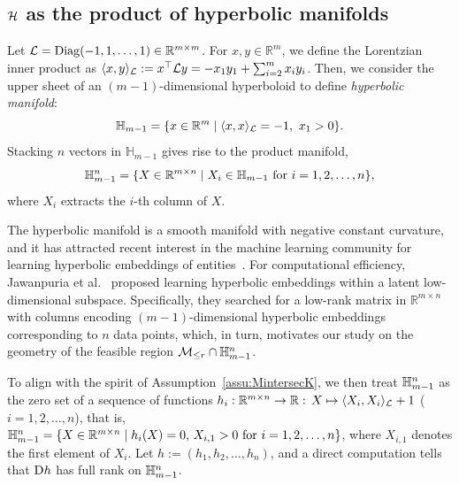 \subsection{$\mathcal{H}$ as the product of hyperbolic manifolds}\label{app:hyperbolic}
Let $\mathcal{L} = \mathrm{Diag}(-1,1,\ldots,1) \in \mathbb{R}^{m\times m}$. For $x, y \in \mathbb{R}^m$, we define the Lorentzian inner product as $\langle x,y\rangle_{\mathcal{L}}:=x^\top \mathcal{L} y = -x_1y_1 + \sum_{i=2}^m x_iy_i$. Then, we consider the upper sheet of an $(m-1)$-dimensional hyperboloid to define \emph{hyperbolic manifold}:
\begin{equation*}
    \mathbb{H}_{m-1}=\{x\in\mathbb{R}^m\mid\langle x,x\rangle_{\mathcal{L}}=-1,\ x_1>0\}.
\end{equation*}
Stacking $n$ vectors in $\mathbb{H}_{m-1}$ gives rise to the product manifold,
\begin{equation}\label{eq:hyperbolicmatrixset}
    \mathbb{H}^n_{m-1}=\{X\in\mbRmn\mid X_i\in\hyperboloid\ \text{for}\ i=1,2,\ldots,n\},
\end{equation}
where $X_{i}$ extracts the $i$-th column of $X$.

The hyperbolic manifold is a smooth manifold with negative constant curvature, and it has attracted recent interest in the machine learning community for learning hyperbolic embeddings of entities~\cite{nickel2018learninghierarchieslorentz}.
For computational efficiency, Jawanpuria et al.~\cite{jawanpuria2019lowrankhyperbolic} proposed learning hyperbolic embeddings within a latent low-dimensional subspace. Specifically, they searched for a low-rank matrix in $\mathbb{R}^{m\times n}$ with columns encoding $(m-1)$-dimensional hyperbolic embeddings corresponding to $n$ data points, which, in turn, motivates our study on the geometry of the feasible region $\mathcal{M}_{\le r} \cap \mathbb{H}^n_{m-1}$.



To align with the spirit of Assumption~\ref{assu:MintersecK}, we then treat $\mathbb{H}^n_{m-1}$ as the zero set of a sequence of functions $h_i:\mathbb{R}^{m\times n}\to\mathbb{R}:\,X\mapsto\langle {X_i,X_i} \rangle_{\mathcal{L}}+1$ ($i=1,2,\ldots,n$), that is, $\mathbb{H}^n_{m-1}=\{X\in\mathbb{R}^{m\times n}\mid h_i(X)=0,\,X_{i,1}>0\ \text{for}\ i=1,2,\ldots,n\}$, where $X_{i,1}$ denotes the first element of $X_i$. Let $h:=(h_1,h_2,\ldots,h_n)$, and a direct computation tells that $\mathrm{D} h$ has full rank on $\mathbb{H}^n_{m-1}$. 

